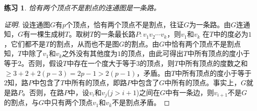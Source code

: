 \documentclass{book}[oneside]
\newtheorem{Exercise}{练习}
\begin{document}
\begin{CJK*}{UTF8}{gbsn}
  \begin{Exercise}
    恰有两个顶点不是割点的连通图是一条路。
  \end{Exercise}
  \begin{proof}[证明]设连通图$G$有$p$个顶点，恰有两个顶点不是割点，往证$G$为一条路。由$G$连通知，$G$有一棵生成树$T$。取树$T$的一条最长路$P:v_1v_2\cdots v_k$，则$v_1$和$v_k$ 在$T$中的度必为$1$，它们都不是$T$的割点，从而也不是图$G$的割点。由$G$中恰有两个顶点不是割点知，$T$中除了$v_1$和$v_k$之外没有其他度为$1$的顶点，由此可得出$T$中所有顶点的度小于等于$2$。否则，假设$T$中存在一个度大于等于$3$的顶点，则$T$中所有顶点的度数之和$\geq 3 + 2 + 2(p-3) = 2p -1 > 2(p-1)$，矛盾。由$T$中所有顶点的度小于等于$2$知，路$P$中包含了$T$中所有的顶点，即路$P$中包含了$G$中所有的顶点。事实上，$G$就是路$P$。否则，在路$P$中，设$v_i$和$v_j$($j>i+1$)之间在$G$中有一条边，则$v_{i+1}$不是$G$的割点，与$G$中只有两个顶点$v_1$和$v_k$不是割点矛盾。
  \end{proof}

\chapter{}

\end{CJK*}
\end{document}
